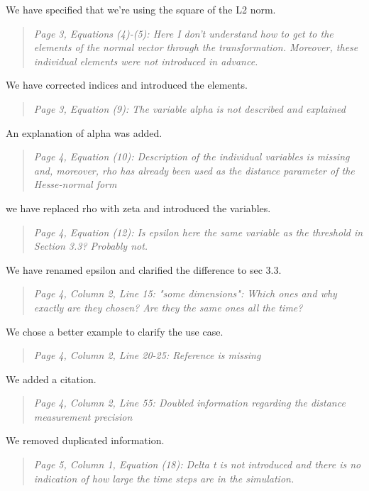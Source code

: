 \documentclass{article}
\newenvironment{itquote}
  {\begin{quote}\itshape}
  {\end{quote}\ignorespacesafterend}
\begin{document}
We have specified that we're using the square of the L2 norm.

\begin{itquote}
Page 3, Equations (4)-(5): Here I don't understand how to get to the
elements of the normal vector through the transformation. Moreover,
these individual elements were not introduced in advance.
\end{itquote}

We have corrected indices and introduced the elements.

\begin{itquote}
Page 3, Equation (9): The variable alpha is not described and
explained
\end{itquote}

An explanation of alpha was added.

\begin{itquote}
Page 4, Equation (10): Description of the individual variables is
missing and, moreover, rho has already been used as the distance
parameter of the Hesse-normal form
\end{itquote}

we have replaced rho with zeta and introduced the variables.

\begin{itquote}
Page 4, Equation (12): Is epsilon here the same variable as the
threshold in Section 3.3? Probably not.
\end{itquote}

We have renamed epsilon and clarified the difference to sec 3.3.

\begin{itquote}
Page 4, Column 2, Line 15: "some dimensions": Which ones and why
exactly are they chosen? Are they the same ones all the time?
\end{itquote}

We chose a better example to clarify the use case.

\begin{itquote}
Page 4, Column 2, Line 20-25: Reference is missing
\end{itquote}

We added a citation.

\begin{itquote}
Page 4, Column 2, Line 55: Doubled information regarding the
distance measurement precision 
\end{itquote}

We removed duplicated information.

\begin{itquote}
Page 5, Column 1, Equation (18): Delta t is not introduced and there
is no indication of how large the time steps are in the simulation.
\end{itquote}
\end{document}
